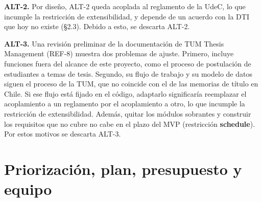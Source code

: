 \documentclass[10pt,a4paper]{article}
\begin{document}
\textbf{ALT-2.} Por diseño, ALT-2 queda acoplada al reglamento de la UdeC, lo que incumple la restricción de extensibilidad, y depende de un acuerdo con la DTI que hoy no existe (§2.3). Debido a esto, se descarta ALT-2.

\textbf{ALT-3.} Una revisión preliminar de la documentación de TUM Thesis Management (REF-8) muestra dos problemas de ajuste. Primero, incluye funciones fuera del alcance de este proyecto, como el proceso de postulación de estudiantes a temas de tesis. Segundo, su flujo de trabajo y su modelo de datos siguen el proceso de la TUM, que no coincide con el de las memorias de título en Chile. Si ese flujo está fijado en el código, adaptarlo significaría reemplazar el acoplamiento a un reglamento por el acoplamiento a otro, lo que incumple la restricción de extensibilidad. Además, quitar los módulos sobrantes y construir los requisitos que no cubre no cabe en el plazo del MVP (restricción \textbf{schedule}). Por estos motivos se descarta ALT-3.


\clearpage
\section{Priorización, plan, presupuesto y equipo}
\end{document}
